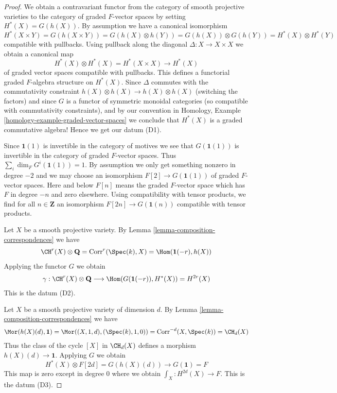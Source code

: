\begin{proof}
We obtain a contravariant functor from the category of smooth
projective varieties to the category of graded $F$-vector spaces
by setting $H^*(X) = G(h(X))$. By assumption we have a canonical
isomorphism
$$
H^*(X \times Y) = G(h(X \times Y)) = G(h(X) \otimes h(Y)) =
G(h(X)) \otimes G(h(Y)) = H^*(X) \otimes H^*(Y)
$$
compatible with pullbacks. Using pullback along the diagonal
$\Delta : X \to X \times X$ we obtain a canonical map
$$
H^*(X) \otimes H^*(X) = H^*(X \times X) \to H^*(X)
$$
of graded vector spaces compatible with pullbacks.
This defines a functorial graded $F$-algebra structure on
$H^*(X)$. Since $\Delta$ commutes with the commutativity
constraint $h(X) \otimes h(X) \to h(X) \otimes h(X)$ (switching the factors)
and since $G$ is a functor of symmetric monoidal categories (so compatible with
commutativity constraints), and by our convention in
Homology, Example \ref{homology-example-graded-vector-spaces}
we conclude that $H^*(X)$ is a graded
commutative algebra! Hence we get our datum (D1).

\medskip\noindent
Since $\mathbf{1}(1)$ is invertible in the category of motives
we see that $G(\mathbf{1}(1))$ is invertible in the category of
graded $F$-vector spaces. Thus $\sum_i \dim_F G^i(\mathbf{1}(1)) = 1$.
By assumption we only get something nonzero in degree $-2$ and we may
choose an isomorphism $F[2] \to G(\mathbf{1}(1))$ of graded $F$-vector spaces.
Here and below $F[n]$ means the graded $F$-vector space which has
$F$ in degree $-n$ and zero elsewhere. Using compatibility with
tensor products, we find for all $n \in \mathbf{Z}$ an isomorphism
$F[2n] \to G(\mathbf{1}(n))$ compatible with tensor products.

\medskip\noindent
Let $X$ be a smooth projective variety. By
Lemma \ref{lemma-composition-correspondences} we have
$$
\CH^r(X) \otimes \mathbf{Q} = \text{Corr}^r(\Spec(k), X) =
\Hom(\mathbf{1}(-r), h(X))
$$
Applying the functor $G$ we obtain
$$
\gamma :
\CH^r(X) \otimes \mathbf{Q} \longrightarrow
\Hom(G(\mathbf{1}(-r)), H^*(X)) = H^{2r}(X)
$$
This is the datum (D2).

\medskip\noindent
Let $X$ be a smooth projective variety of dimension $d$. By
Lemma \ref{lemma-composition-correspondences} we have
$$
\Mor(h(X)(d), \mathbf{1}) = \Mor((X, 1, d), (\Spec(k), 1, 0)) =
\text{Corr}^{-d}(X, \Spec(k)) = \CH_d(X)
$$
Thus the class of the cycle $[X]$ in $\CH_d(X)$ defines a morphism
$h(X)(d) \to \mathbf{1}$. Applying $G$ we obtain
$$
H^*(X) \otimes F[2d] = G(h(X)(d)) \longrightarrow G(\mathbf{1}) = F
$$
This map is zero except in degree $0$ where we obtain
$\int_X : H^{2d}(X) \to F$. This is the datum (D3).


\end{proof}

